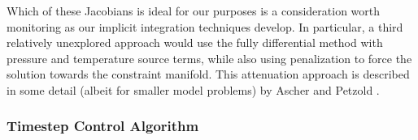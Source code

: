 Which of these Jacobians is ideal for our purposes is a consideration worth
monitoring as our implicit integration techniques develop. In particular, 
a third relatively unexplored approach would use the fully differential
method with pressure and temperature source terms, while also using penalization
to force the solution towards the constraint manifold. This attenuation approach
is described in some detail (albeit for smaller model problems) by Ascher and
Petzold \cite{ascher1998computer}.

\subsubsection{Timestep Control Algorithm}


